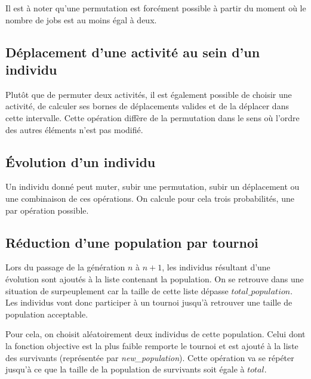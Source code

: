 Il est à noter qu'une permutation est forcément possible à partir du moment où le nombre de jobs est au moins égal à deux.

\newpage

\subsection{Déplacement d'une activité au sein d'un individu}



Plutôt que de permuter deux activités, il est également possible de choisir une activité, de calculer ses bornes de déplacements valides et de la déplacer dans cette intervalle. Cette opération diffère de la permutation dans le sens où l'ordre des autres éléments n'est pas modifié.

\subsection{Évolution d'un individu}



Un individu donné peut muter, subir une permutation, subir un déplacement ou une combinaison de ces opérations. On calcule pour cela trois probabilités, une par opération possible. 

\subsection{Réduction d'une population par tournoi}

Lors du passage de la génération $n$ à $n+1$, les individus résultant d'une évolution sont ajoutés à la liste contenant la population. On se retrouve dans une situation de surpeuplement car la taille de cette liste dépasse $total\_population$. Les individus vont donc participer à un tournoi jusqu'à retrouver une taille de population acceptable.

\newpage



Pour cela, on choisit aléatoirement deux individus de cette population. Celui dont la fonction objective est la plus faible remporte le tournoi et est ajouté à la liste des survivants (représentée par \textit{new\_population}). Cette opération va se répéter jusqu'à ce que la taille de la population de survivants soit égale à $total$.

